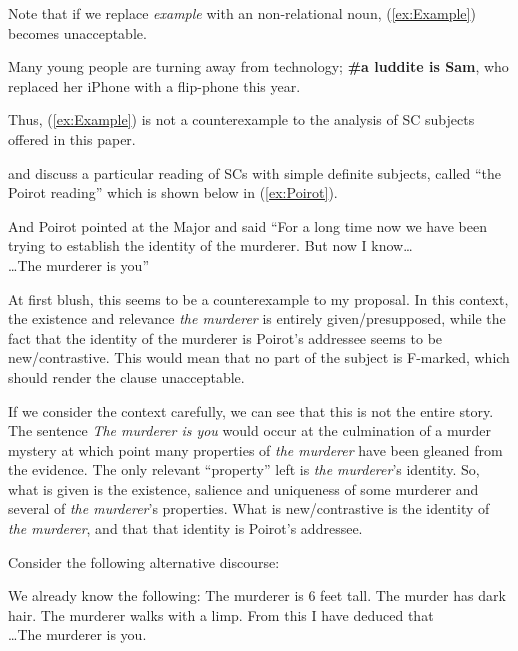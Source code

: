 \documentclass[
]{RCL}
\begin{document}
Note that if we replace \textit{example} with an non-relational noun, (\ref{ex:Example}) becomes unacceptable.
\begin{exe}
	\ex\label{ex:Luddite} Many young people are turning away from technology; \textbf{\#a luddite is Sam}, who replaced her iPhone with a flip-phone this year.
\end{exe}
Thus, (\ref{ex:Example}) is not a counterexample to the analysis of SC subjects offered in this paper.


\citet{heycock2010variability} and \citet{bejarkahnemuyipour2013agreement} discuss a particular reading of SCs with simple definite subjects, called ``the Poirot reading'' which is shown below in (\ref{ex:Poirot}).
\begin{exe}
	\ex\label{ex:Poirot} And Poirot pointed at the Major and said ``For a long time now we have been trying to establish the identity of the murderer. But now I know\ldots\\
	\ldots The murderer is you''
\end{exe}

At first blush, this seems to be a counterexample to my proposal.
In this context, the existence and relevance \textit{the murderer} is entirely given/presupposed, while the fact that the identity of the murderer is Poirot's addressee seems to be new/contrastive. 
This would mean that no part of the subject is F-marked, which should render the clause unacceptable.

If we consider the context carefully, we can see that this is not the entire story.
The sentence \textit{The murderer is you} would occur at the culmination of a murder mystery at which point many properties of \textit{the murderer} have been gleaned from the evidence.
The only relevant ``property'' left is \textit{the murderer}'s identity.
So, what is given is the existence, salience and uniqueness of  some murderer and several of \textit{the murderer}'s properties.
What is new/contrastive is the identity of \textit{the murderer}, and that that identity is Poirot's addressee.

Consider the following alternative discourse:
\begin{exe}
	\ex\label{ex:Poirot2} We already know the following: The murderer is 6 feet tall. The murder has dark hair. The murderer walks with a limp. From this I have deduced that \\
\ldots The murderer is you.
\end{exe}
\end{document}
